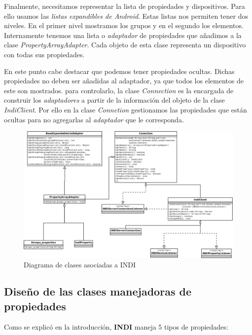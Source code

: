 \bigskip
Finalmente, necesitamos representar la lista de propiedades y dispositivos. Para ello usamos las \textit{listas expandibles de Android}\cite{AELVT}. Estas listas nos permiten tener dos niveles. En el primer nivel mostramos los grupos y en el segundo los elementos. Internamente tenemos una lista o \textit{adaptador} de propiedades que añadimos a la clase \textit{PropertyArrayAdapter}. Cada objeto de esta clase representa un dispositivo con todas sus propiedades. 

\bigskip
En este punto cabe destacar que podemos tener propiedades ocultas. Dichas propiedades no deben ser añadidas al adaptador, ya que todos los elementos de este son mostrados. para controlarlo, la clase \textit{Connection} es la encargada de construir los \textit{adaptadores} a partir de la información del objeto de la clase \textit{IndiClient}. Por ello en la clase \textit{Connetion} gestionamos las propiedades que están ocultas para no agregarlas al \textit{adaptador} que le corresponda.


\bigskip
\begin{figure}[!ht]
  \begin{center}
  \includegraphics[width=1\textwidth]{../images/indi_diag_clases.png}
  \caption{Diagrama de clases asociadas a INDI}
  \label{fig:diag_indi_clases}
  \end{center}
\end{figure}


\newpage
\subsection{Diseño de las clases manejadoras de propiedades}

Como se explicó en la introducción, \textbf{INDI} maneja 5 tipos de propiedades:


